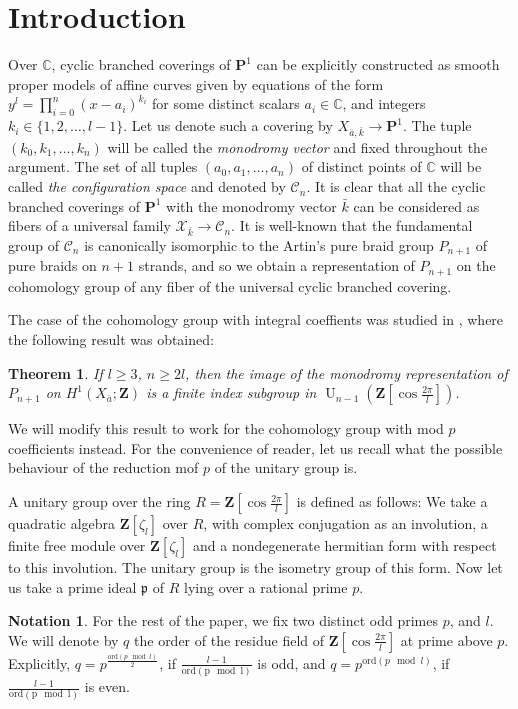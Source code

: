 \documentclass{article}
\newtheorem{theorem}{Theorem}
\theoremstyle{definition}
\newtheorem*{notation}{Notation}
\DeclareMathOperator{\U}{\mathrm{U}}
\begin{document}
	\section{Introduction}
	Over $\mathbb{C}$, cyclic branched coverings of $\mathbf{P}^1$ can be explicitly constructed as smooth proper models of affine curves given by equations of the form $y^l = \prod_{i=0}^n (x-a_i)^{k_i}$ for some distinct scalars $a_i \in \mathbb{C}$, and integers $k_i \in \{1, 2, \ldots, l-1 \}$. Let us denote such a covering by $X_{\bar{a}, \bar{k}} \to  \mathbf{P}^1$. The tuple $(k_0, k_1, \ldots, k_n)$ will be called the \emph{monodromy vector} and fixed throughout the argument. The set of all tuples $(a_0, a_1, \ldots, a_n)$ of distinct points of $\mathbb{C}$ will be called \emph{the configuration space} and denoted by $\mathcal{C}_n$. It is clear that all the cyclic branched coverings of $\mathbf{P}^1$ with the monodromy vector $\bar{k}$ can be considered as fibers of a universal family $\mathcal{X}_{\bar{k}} \to \mathcal{C}_n$. It is well-known that the fundamental group of $\mathcal{C}_n$ is canonically isomorphic to the Artin's pure braid group $P_{n+1}$ of pure braids on $n+1$ strands, and so we obtain a representation of $P_{n+1}$ on the cohomology group of any fiber of the universal cyclic branched covering. \par 
	The case of the cohomology group with integral coeffients was studied in \cite{cyclic}, where the following result was obtained:
	\begin{theorem} \cite[Theorem 2]{cyclic}
		If $l \geq 3$, $n \geq 2l$, then the image of the monodromy representation of $P_{n+1}$ on $H^1(X_{\bar{a}}; \mathbf{Z})$ is a finite index subgroup in $\U_{n-1}(\mathbf{Z}[\cos \frac{2 \pi}{l}])$.
	\end{theorem}
	We will modify this result to work for the cohomology group with mod $p$ coefficients instead. For the convenience of reader, let us recall what the possible behaviour of the reduction mof $p$ of the unitary group is. \par 
	A unitary group over the ring $R=\mathbf{Z}[\cos \frac{2 \pi}{l}]$ is defined as follows: We take a quadratic algebra $\mathbf{Z}[\zeta_l]$ over $R$, with complex conjugation as an involution, a finite free module over $\mathbf{Z}[\zeta_l]$ and a nondegenerate hermitian form with respect to this involution. The unitary group is the isometry group of this form. Now let us take a prime ideal $\mathfrak{p}$ of $R$ lying over a rational prime $p$. 
	\begin{notation} For the rest of the paper, we fix two distinct odd primes $p$, and $l$. We will denote by $q$ the order of the residue field of $\mathbf{Z}[\cos \frac{2 \pi}{l}]$ at prime above $p$. Explicitly, $q=p^{\frac{\mathrm{ord} (p \mod l)}{2}}$, if $\frac{l-1}{\mathrm{ord (p \mod l)}}$ is odd, and $q=p^{\mathrm{ord} (p \mod l)}$, if $\frac{l-1}{\mathrm{ord (p \mod l)}}$ is even. 
	\end{notation}
\end{document}
